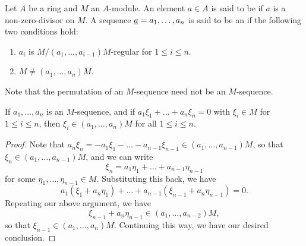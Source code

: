 \begin{definition}
    Let $A$ be a ring and $M$ an $A$-module. An element $a\in A$ is said to be  if $a$ is a non-zero-divisor on $M$. A sequence $\underline{a} = a_1,\dots, a_n$ is said to be an  if the following two conditions hold: 
    \begin{enumerate}[label=(\arabic*)]
        \item $a_i$ is $M/(a_1,\dots,a_{i - 1})M$-regular for $1\le i\le n$. 
        \item $M\ne (a_1,\dots, a_n)M$.
    \end{enumerate}
\end{definition}

\begin{remark}
    Note that the permutation of an $M$-sequence need not be an $M$-sequence.
\end{remark}

\begin{lemma}
    If $a_1,\dots,a_n$ is an $M$-sequence, and if $a_1\xi_1 + \dots + a_n\xi_n = 0$ with $\xi_i\in M$ for $1\le i\le n$, then $\xi_i\in (a_1,\dots,a_n)M$ for all $1\le i\le n$.
\end{lemma}
\begin{proof}
    Note that $a_n\xi_n = -a_1\xi_1 - \dots - a_{n - 1}\xi_{n - 1}\in (a_1,\dots,a_{n - 1})M$, so that $\xi_n\in (a_1,\dots,a_{n - 1})M$, and we can write 
    \begin{equation*}
        \xi_n = a_1\eta_1 + \dots + a_{n - 1}\eta_{n - 1}
    \end{equation*}
    for some $\eta_1,\dots,\eta_{n - 1}\in M$. Substituting this back, we have 
    \begin{equation*}
        a_1(\xi_1 + a_n\eta_1) + \dots + a_{n - 1}(\xi_{n - 1} + a_n\eta_{n - 1}) = 0.
    \end{equation*}
    Repeating our above argument, we have 
    \begin{equation*}
        \xi_{n - 1} + a_n\eta_{n - 1}\in (a_1,\dots,a_{n - 2}) M,
    \end{equation*}
    so that $\xi_{n - 1}\in (a_1,\dots,a_n) M$. Continuing this way, we have our desired conclusion.
\end{proof}

